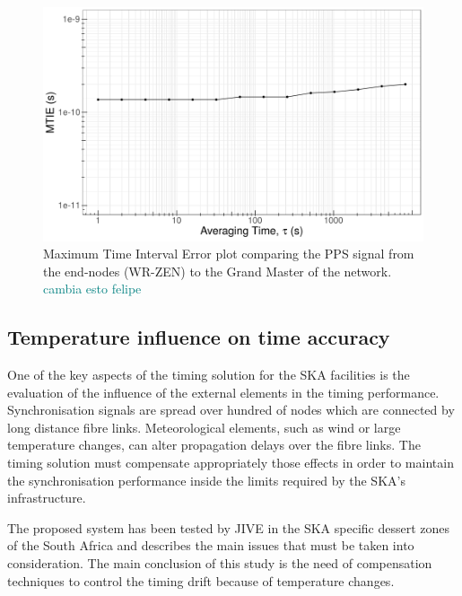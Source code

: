 \begin{figure}
	\centering
	\includegraphics[width=0.7\linewidth]{img/MTIE_exp3}
	\caption[MTIE of the end-nodes in the scalability test.]{Maximum Time 
	Interval Error plot comparing the PPS signal from the end-nodes (WR-ZEN) to 
	the Grand Master of the network. \textcolor{teal}{cambia esto felipe}}
	\label{fig:mtienet}
\end{figure}

\subsection{Temperature influence on time accuracy}
\label{subsec:temp}

One of the key aspects of the timing solution for the SKA facilities is the 
evaluation of the influence of the external elements in the timing performance. 
Synchronisation signals are spread over hundred of nodes which are connected by 
long distance fibre links. Meteorological elements, such as wind or large 
temperature changes, can alter propagation delays over the fibre 
links. The timing solution must compensate appropriately those effects in order 
to maintain the synchronisation performance inside the limits required by the 
SKA's infrastructure. 

The proposed system has been tested by JIVE \cite{jive:website} in the SKA specific dessert zones of 
the South Africa and \cite{paul-boven-paper-icalepcs} describes the main issues 
that must be taken into consideration. The main conclusion of this study is the
need of compensation techniques to control the timing drift because of
temperature changes.

